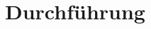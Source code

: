 \documentclass[10pt,twocolumn]{scrartcl}
\begin{document}
\section*{Durchführung}

%
%
%
%
%
%
\end{document}
